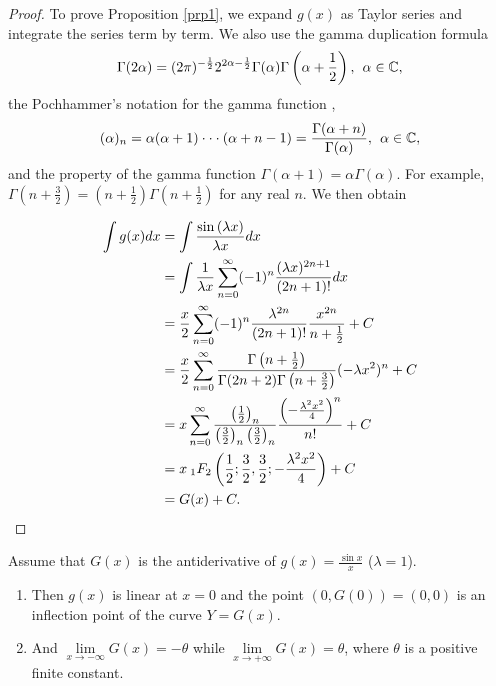 \documentclass[smallextended]{svjour3}
\begin{document}
\begin{proof}
To prove Proposition \ref{prp1},
we expand $g(x)$ as Taylor series and integrate the series term by term.
We also use the gamma duplication formula \cite{AS}
\begin{equation}
\Gamma(2\alpha)=(2\pi)^{-\frac{1}{2}}2^{2\alpha-\frac{1}{2}}\Gamma(\alpha)\Gamma\left(\alpha+\frac{1}{2}\right), \hspace{.15cm} \alpha\in\mathbb{C},
\label{duplication}
\end{equation}
the Pochhammer's notation for the gamma function \cite{AS},
\begin{equation}
(\alpha)_n=\alpha (\alpha+1)\cdot\cdot\cdot(\alpha+n-1)=\frac{\Gamma(\alpha+n)}{\Gamma(\alpha)}, \hspace{.15cm} \alpha\in\mathbb{C},
\label{Po}
\end{equation}
and the property of the gamma function $\Gamma(\alpha+1)=\alpha\Gamma(\alpha)$. For example, $\Gamma\left(n+\frac{3}{2}\right)=\left(n+\frac{1}{2}\right)\Gamma\left(n+\frac{1}{2}\right)$ for any real $n$. We then obtain

\begin{align}
\int g(x)dx&=\int \frac{\sin{(\lambda x)}}{\lambda x}dx
\nonumber \\&=\int\frac{1}{\lambda x}\sum\limits_{n=0}^{\infty}(-1)^n\frac{(\lambda x)^{2n+1}}{(2n+1)!}dx
\nonumber\\&=\frac{x}{2}\sum\limits_{n=0}^{\infty}(-1)^n\frac{\lambda^{2n}}{(2n+1)!}\frac{x^{2n}}{n+\frac{1}{2}}+C
\nonumber\\&=\frac{x}{2}\sum\limits_{n=0}^{\infty}\frac{\Gamma\left(n+\frac{1}{2}\right)}{\Gamma(2n+2)\Gamma\left(n+\frac{3}{2}\right)}(-\lambda x^{2})^{n}+C
\nonumber\\&={x}\sum\limits_{n=0}^{\infty}\frac{\left(\frac{1}{2}\right)_n}{\left(\frac{3}{2}\right)_n\left(\frac{3}{2}\right)_n}\frac{\left(-\frac{\lambda^2 x^2}{4}\right)^{n}}{n!}+C
\nonumber\\&={x}\hspace{.075cm} _{1}F_{2}\left(\frac{1}{2};\frac{3}{2},\frac{3}{2};-\frac{\lambda^2 x^2}{4}\right)+C \nonumber \\&=
G(x)+C.
\label{prp1-2}
\end{align}
\nonumber
\end{proof}

\begin{lemma}
Assume that $G(x)$ is the antiderivative of $g(x)=\frac{\sin{x}}{x}$ ($\lambda=1$).
\begin{enumerate}
\item Then $g(x)$ is linear at $x=0$ and the point $(0,G(0))=(0,0)$ is an inflection point of the curve $Y=G(x)$.
\item And $\lim\limits_{x\rightarrow-\infty}G(x)=-\theta$ while $\lim\limits_{x\rightarrow+\infty}G(x)=\theta$, where $\theta$ is a positive finite constant.
\end{enumerate}
\label{Lm1}
\end{lemma}
\end{document}
